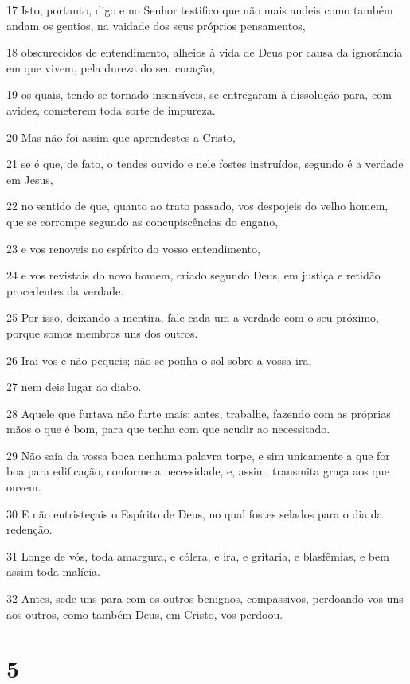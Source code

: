\par 17 Isto, portanto, digo e no Senhor testifico que não mais andeis como também andam os gentios, na vaidade dos seus próprios pensamentos,
\par 18 obscurecidos de entendimento, alheios à vida de Deus por causa da ignorância em que vivem, pela dureza do seu coração,
\par 19 os quais, tendo-se tornado insensíveis, se entregaram à dissolução para, com avidez, cometerem toda sorte de impureza.
\par 20 Mas não foi assim que aprendestes a Cristo,
\par 21 se é que, de fato, o tendes ouvido e nele fostes instruídos, segundo é a verdade em Jesus,
\par 22 no sentido de que, quanto ao trato passado, vos despojeis do velho homem, que se corrompe segundo as concupiscências do engano,
\par 23 e vos renoveis no espírito do vosso entendimento,
\par 24 e vos revistais do novo homem, criado segundo Deus, em justiça e retidão procedentes da verdade.
\par 25 Por isso, deixando a mentira, fale cada um a verdade com o seu próximo, porque somos membros uns dos outros.
\par 26 Irai-vos e não pequeis; não se ponha o sol sobre a vossa ira,
\par 27 nem deis lugar ao diabo.
\par 28 Aquele que furtava não furte mais; antes, trabalhe, fazendo com as próprias mãos o que é bom, para que tenha com que acudir ao necessitado.
\par 29 Não saia da vossa boca nenhuma palavra torpe, e sim unicamente a que for boa para edificação, conforme a necessidade, e, assim, transmita graça aos que ouvem.
\par 30 E não entristeçais o Espírito de Deus, no qual fostes selados para o dia da redenção.
\par 31 Longe de vós, toda amargura, e cólera, e ira, e gritaria, e blasfêmias, e bem assim toda malícia.
\par 32 Antes, sede uns para com os outros benignos, compassivos, perdoando-vos uns aos outros, como também Deus, em Cristo, vos perdoou.

\chapter{5}

